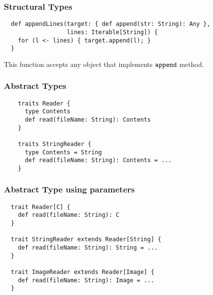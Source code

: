 \documentclass[handout]{beamer}
\begin{document}
\begin{frame}[fragile]
  \frametitle{Structural Types}
  \begin{verbatim}
  def appendLines(target: { def append(str: String): Any },
                  lines: Iterable[String]) {
    for (l <- lines) { target.append(l); }
  }
  \end{verbatim}
  This function accepts any object that implements $\verb|append|$ method.
\end{frame}

\begin{frame}[fragile]
  \frametitle{Abstract Types}
  \begin{verbatim}
    traits Reader {
      type Contents
      def read(fileName: String): Contents
    }

    traits StringReader {
      type Contents = String
      def read(fileName: String): Contents = ...
    }
  \end{verbatim}
\end{frame}

\begin{frame}[fragile]
  \frametitle{Abstract Type using parameters}
  \begin{verbatim}
  trait Reader[C] {
    def read(fileName: String): C
  }

  trait StringReader extends Reader[String] {
    def read(fileName: String): String = ...
  }

  trait ImageReader extends Reader[Image] {
    def read(fileName: String): Image = ...
  }
  \end{verbatim}
\end{frame}
\end{document}

